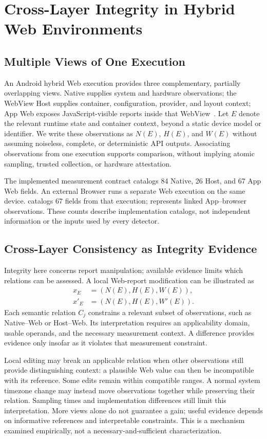 \section{Cross-Layer Integrity in Hybrid Web Environments}
\label{sec:setting}
\subsection{Multiple Views of One Execution}
An Android hybrid Web execution provides three complementary, partially overlapping views. Native supplies system and hardware observations; the WebView Host supplies container, configuration, provider, and layout context; App Web exposes JavaScript-visible reports inside that WebView~\cite{android2026webview}. Let $E$ denote the relevant runtime state and container context, beyond a static device model or identifier. We write these observations as $N(E)$, $H(E)$, and $W(E)$ without assuming noiseless, complete, or deterministic API outputs. Associating observations from one execution supports comparison, without implying atomic sampling, trusted collection, or hardware attestation.

The implemented \appfp measurement contract catalogs 84 Native, 26 Host, and 67 App Web fields. An external Browser runs a separate Web execution on the same device. \browserfp catalogs 67 fields from that execution; \pairedfp represents linked App--browser observations. These counts describe implementation catalogs, not independent information or the inputs used by every detector.

\subsection{Cross-Layer Consistency as Integrity Evidence}
Integrity here concerns report manipulation; available evidence limits which relations can be assessed. A local Web-report modification can be illustrated as
\[
\begin{aligned}
x_E &= (N(E),H(E),W(E)),\\
x'_E &= (N(E),H(E),W'(E)).
\end{aligned}
\]
Each semantic relation $C_j$ constrains a relevant subset of observations, such as Native--Web or Host--Web. Its interpretation requires an applicability domain, usable operands, and the necessary measurement context. A difference provides evidence only insofar as it violates that measurement constraint.

Local editing may break an applicable relation when other observations still provide distinguishing context: a plausible Web value can then be incompatible with its reference. Some edits remain within compatible ranges. A normal system timezone change may instead move observations together while preserving their relation. Sampling times and implementation differences still limit this interpretation. More views alone do not guarantee a gain; useful evidence depends on informative references and interpretable constraints. This is a mechanism examined empirically, not a necessary-and-sufficient characterization.

